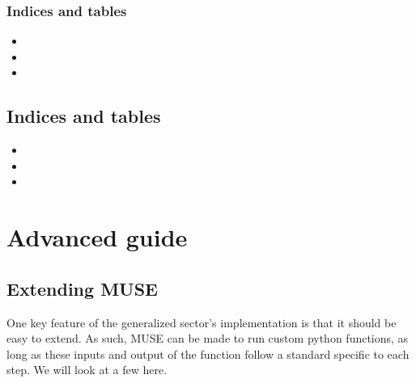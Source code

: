 \documentclass[letterpaper,10pt,english]{sphinxmanual}
\begin{document}
\subsection{Indices and tables}
\label{\detokenize{inputs/inputs_csv:indices-and-tables}}\begin{itemize}
\item {} 

\item {} 

\item {} 

\end{itemize}


\section{Indices and tables}
\label{\detokenize{inputs/index:indices-and-tables}}\begin{itemize}
\item {} 

\item {} 

\item {} 

\end{itemize}


\chapter{Advanced guide}
\label{\detokenize{advanced-guide/index:advanced-guide}}\label{\detokenize{advanced-guide/index::doc}}

\section{Extending MUSE}
\label{\detokenize{advanced-guide/extending-muse:Extending-MUSE}}\label{\detokenize{advanced-guide/extending-muse::doc}}
One key feature of the generalized sector’s implementation is that it should be easy to extend. As such, MUSE can be made to run custom python functions, as long as these inputs and output of the function follow a standard specific to each step. We will look at a few here.
\end{document}
